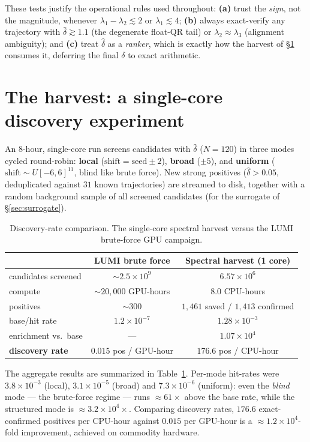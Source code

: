 \documentclass[11pt,a4paper]{article}
\theoremstyle{definition}
\newcommand{\dhat}{\hat{\delta}}
\begin{document}
These tests justify the operational rules used throughout: \textbf{(a)} trust the \emph{sign},
not the magnitude, whenever $\lambda_1-\lambda_2\lesssim2$ or $\lambda_1\lesssim4$; \textbf{(b)}
always exact-verify any trajectory with $\dhat\gtrsim1.1$ (the degenerate float-QR tail) or
$\lambda_2\approx\lambda_3$ (alignment ambiguity); and \textbf{(c)} treat $\dhat$ as a
\emph{ranker}, which is exactly how the harvest of \S\ref{sec:harvest} consumes it, deferring
the final $\delta$ to exact arithmetic.

\section{The harvest: a single-core discovery experiment}
\label{sec:harvest}
An $8$-hour, single-core run screens candidates with $\dhat$ ($N=120$) in three modes cycled
round-robin: \textbf{local} ($\mathrm{shift}=\text{seed}\pm2$), \textbf{broad}
($\pm5$), and \textbf{uniform} ($\mathrm{shift}\sim U[-6,6]^{11}$, blind like brute force).
New strong positives ($\dhat>0.05$, deduplicated against $31$ known trajectories) are streamed
to disk, together with a random background sample of all screened candidates (for the
surrogate of \S\ref{sec:surrogate}).

\begin{table}[t]\centering
\caption{Discovery-rate comparison. The single-core spectral harvest versus the LUMI
brute-force GPU campaign.}
\label{tab:harvest}
\begin{tabular}{lcc}
\toprule
 & LUMI brute force & Spectral harvest (1 core) \\
\midrule
candidates screened & ${\sim}2.5\times10^{9}$ & $6.57\times10^{6}$ \\
compute & ${\sim}20{,}000$ GPU-hours & $8.0$ CPU-hours \\
positives & ${\sim}300$ & $1{,}461$ saved / $1{,}413$ confirmed \\
base/hit rate & $1.2\times10^{-7}$ & $1.28\times10^{-3}$ \\
enrichment vs.\ base & --- & $1.07\times10^{4}$ \\
\textbf{discovery rate} & $0.015$ pos / GPU-hour & $\mathbf{176.6}$ pos / CPU-hour \\
\bottomrule
\end{tabular}
\end{table}

The aggregate results are summarized in Table~\ref{tab:harvest}. Per-mode hit-rates were
$3.8\times10^{-3}$ (local), $3.1\times10^{-5}$ (broad) and $7.3\times10^{-6}$ (uniform): even
the \emph{blind} mode --- the brute-force regime --- runs ${\approx}61\times$ above the base
rate, while the structured mode is ${\approx}3.2\times10^{4}\times$. Comparing discovery
rates, $176.6$ exact-confirmed positives per CPU-hour against $0.015$ per GPU-hour is a
${\approx}1.2\times10^{4}$-fold improvement, achieved on commodity hardware.
\end{document}
